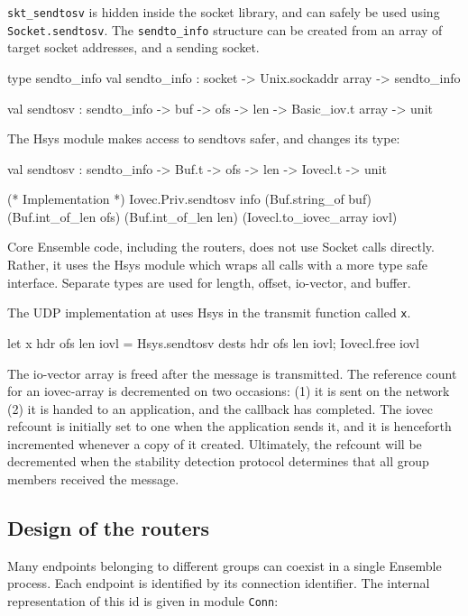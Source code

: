 {\tt skt\_sendtosv} is hidden inside the socket library, and can
safely be used using {\tt Socket.sendtosv}. The {\tt sendto\_info}
structure can be created from an array of target socket addresses, and
a sending socket.

\begin{codebox}
type sendto_info
val sendto_info : socket -> Unix.sockaddr array -> sendto_info

val sendtosv : sendto_info -> buf -> ofs -> len -> Basic_iov.t array -> unit
\end{codebox}


The Hsys module makes access to sendtovs safer, and changes its type:
\begin{codebox}
  val sendtosv : sendto_info -> Buf.t -> ofs -> len -> Iovecl.t -> unit

(* Implementation *)
  Iovec.Priv.sendtosv info 
    (Buf.string_of buf) (Buf.int_of_len ofs) (Buf.int_of_len len) 
    (Iovecl.to_iovec_array iovl) 
\end{codebox}
Core Ensemble code, including the routers, does not use Socket calls
directly. Rather, it uses the Hsys module which wraps all calls with a
more type safe interface. Separate types are used for length, offset,
io-vector, and buffer.

The UDP implementation at  uses Hsys in the 
transmit function called {\tt x}.

\begin{codebox}
  let x hdr ofs len iovl = 
    Hsys.sendtosv dests hdr ofs len iovl;
    Iovecl.free iovl
\end{codebox}

The io-vector array is freed after the message is transmitted. The
reference count for an iovec-array is decremented on two occasions:
(1) it is sent on the network (2) it is handed to an application, and
the callback has completed. The iovec refcount is initially set to one
when the application sends it, and it is henceforth incremented
whenever a copy of it created. Ultimately, the refcount will be
decremented when the stability detection protocol determines that all
group members received the message.

\subsection{Design of the routers}
Many endpoints belonging to different groups can coexist in a single
Ensemble process. Each endpoint is identified by its connection
identifier. The internal representation of this id is given in module
{\tt Conn}:

